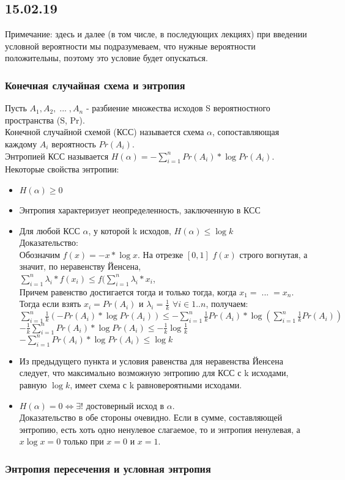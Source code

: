 \subsection{15.02.19}
Примечание: здесь и далее (в том числе, в последующих лекциях) при введении условной вероятности мы подразумеваем, что нужные вероятности положительны, поэтому это условие будет опускаться.
\subsubsection{Конечная случайная схема и энтропия}
Пусть $A_1, A_2, \; ... \; , A_n$ - разбиение множества исходов S вероятностного пространства (S, Pr). \\
Конечной случайной схемой (КСС) называется схема $\alpha$, сопоставляющая каждому $A_i$ вероятность $Pr(A_i)$.\\
Энтропией КСС называется $H(\alpha) = -\sum\limits_{i = 1}^n Pr(A_i) * \log Pr(A_i)$.\\
Некоторые свойства энтропии:\\
\begin{itemize}
\item $H(\alpha) \geq 0$\\
\item Энтропия характеризует неопределенность, заключенную в КСС\\
\item Для любой КСС $\alpha$, у которой k исходов, $H(\alpha) \leq \log k$\\
Доказательство:\\
Обозначим $f(x) = -x * \log x$. На отрезке $[0, 1]$ $f(x)$ строго вогнутая, а значит, по неравенству Йенсена,\\
$\sum\limits_{i = 1}^n \lambda_i * f(x_i) \leq f(\sum\limits_{i = 1}^n \lambda_i * x_i$, \\
Причем равенство достигается тогда и только тогда, когда $x_1 = \; ... \; = x_n$.\\
Тогда если взять $x_i = Pr(A_i)$ и $\lambda_i = \frac{1}{k}$ $\forall i \in 1..n$, получаем:\\
$\sum\limits_{i = 1}^n \frac{1}{k}(-Pr(A_i) * \log Pr(A_i)) \leq -\sum\limits_{i = 1}^n \frac{1}{k}Pr(A_i) * \log (\sum\limits_{i = 1}^n \frac{1}{k}Pr(A_i))$\\
$-\frac{1}{k} \sum\limits_{i = 1}^n Pr(A_i) * \log Pr(A_i) \leq -\frac{1}{k} \log\frac{1}{k}$\\
$-\sum\limits_{i = 1}^n Pr(A_i) * \log Pr(A_i) \leq \log k$\\
\item Из предыдущего пункта и условия равенства для неравенства Йенсена следует, что максимально возможную энтропию для КСС с k исходами, равную $\log k$, имеет схема с k равновероятными исходами.\\
\item $H(\alpha) = 0 \Leftrightarrow \exists!$ достоверный исход в $\alpha$. \\
Доказательство в обе стороны очевидно. Если в сумме, составляющей энтропию, есть хоть одно ненулевое слагаемое, то и энтропия ненулевая, а $x \log x = 0$ только при $x = 0$ и $x = 1$.
\end{itemize}
\subsubsection{Энтропия пересечения и условная энтропия}
